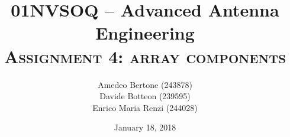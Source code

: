 \documentclass[11pt,a4paper,oneside,openright]{article}
\title{	01NVSOQ -- Advanced Antenna Engineering \\
	\huge {\textsc{Assignment 4: array components}}	}
\begin{document}
\author{Amedeo Bertone (243878)\\Davide Botteon (239595)\\Enrico Maria Renzi (244028)\\
}
\date{January 18, 2018}
\maketitle 		
\tableofcontents





\end{document}
